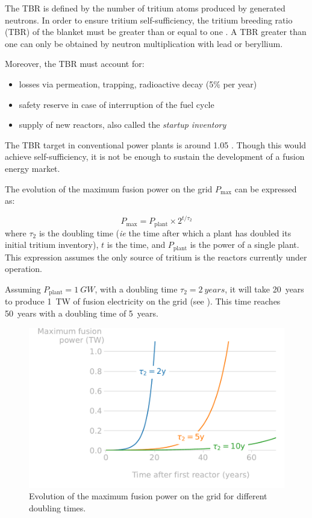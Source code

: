 The TBR is defined by the number of tritium atoms produced by generated neutrons.
In order to ensure tritium self-sufficiency, the tritium breeding ratio (TBR) of the blanket must be greater than or equal to one .
A TBR greater than one can only be obtained by neutron multiplication with lead or beryllium.

Moreover, the TBR must account for:
\begin{itemize}
    \item losses via permeation, trapping, radioactive decay (5\% per year)
    \item safety reserve in case of interruption of the fuel cycle
    \item supply of new reactors, also called the \textit{startup inventory}
\end{itemize}

The TBR target in conventional power plants is around 1.05 .
Though this would achieve self-sufficiency, it is not be enough to sustain the development of a fusion energy market.

The evolution of the maximum fusion power on the grid $P_\mathrm{max}$ can be expressed as:

\begin{equation}
    P_\mathrm{max} = P_\mathrm{plant} \times 2^{t/\tau_2}
\end{equation}
where $\tau_2$ is the doubling time (\textit{ie} the time after which a plant has doubled its initial tritium inventory), $t$ is the time, and $P_\mathrm{plant}$ is the power of a single plant.
This expression assumes the only source of tritium is the reactors currently under operation.

Assuming $P_\mathrm{plant} = \SI{1}{GW}$, with a doubling time $\tau_2 = \SI{2}{years}$, it will take \SI{20}{years} to produce \SI{1}{TW} of fusion electricity on the grid (see ).
This time reaches \SI{50}{years} with a doubling time of \SI{5}{years}.

\begin{figure}
    \centering
    \includegraphics[width=0.8\linewidth]{Figures/Chapter1/doubling_time.pdf}
    \caption{Evolution of the maximum fusion power on the grid for different doubling times.}
\end{figure}

